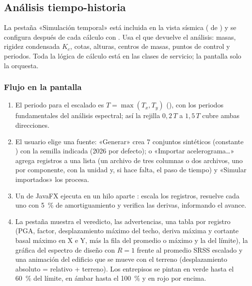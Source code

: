 \subsection{Análisis tiempo-historia}
\label{sec:sis-th}

La pestaña «Simulación temporal» está incluida en la vista sísmica ( de )
y se configura después de cada cálculo con . Usa el
 que devuelve el análisis: masas, rigidez condensada $K_c$, cotas, alturas, centros de masas,
puntos de control y periodos. Toda la lógica de cálculo está en las clases de servicio; la pantalla solo la orquesta.

\subsubsection{Flujo en la pantalla}

\begin{enumerate}
	\item El periodo para el escalado es $T = \max(T_x, T_y)$ (),
	      con los periodos fundamentales del análisis espectral; así la rejilla $0{,}2\,T$ a $1{,}5\,T$ cubre ambas
	      direcciones.
	\item El usuario elige una fuente: «Generar» crea 7 conjuntos sintéticos (constante
	      ) con la semilla indicada (2026 por defecto); o «Importar
	      acelerograma\ldots» agrega registros a una lista (un archivo de tres columnas o dos archivos, uno por componente,
	      con la unidad y, si hace falta, el paso de tiempo) y «Simular importados» los procesa.
	\item Un  de JavaFX ejecuta en un hilo aparte : escala los
	      registros, resuelve cada uno con 5~\% de amortiguamiento y verifica las derivas, informando el avance.
	\item La pestaña muestra el veredicto, las advertencias, una tabla por registro (PGA, factor, desplazamiento máximo del
	      techo, deriva máxima y cortante basal máximo en X e Y, más la fila del promedio o máximo y la del límite), la
	      gráfica del espectro de diseño con $R = 1$ frente al promedio SRSS escalado y una animación del edificio que se
	      mueve con el terreno (desplazamiento absoluto = relativo + terreno). Los entrepisos se pintan en verde hasta el
	      60~\% del límite, en ámbar hasta el 100~\% y en rojo por encima.
\end{enumerate}

